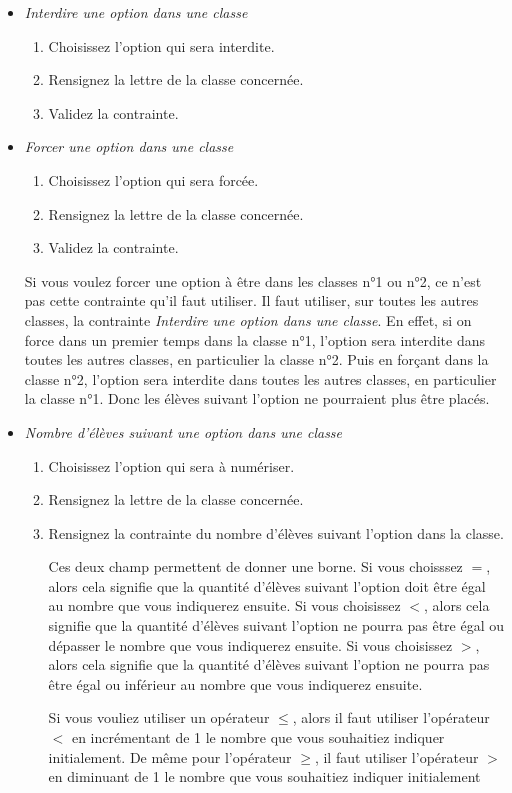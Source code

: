 \documentclass[11pt,a4paper]{article}
\begin{document}
\begin{enumerate}
\begin{itemize}
\begin{enumerate}
    \end{enumerate}
    \item \textit{Interdire une option dans une classe}
    \begin{enumerate}
      \item Choisissez l'option qui sera interdite.
      \item Rensignez la lettre de la classe concernée.
      \item Validez la contrainte.
    \end{enumerate}
    \item \textit{Forcer une option dans une classe}
    \begin{enumerate}
      \item Choisissez l'option qui sera forcée.
      \item Rensignez la lettre de la classe concernée.
      \item Validez la contrainte.
    \end{enumerate}
    \begin{astuce}Si vous voulez forcer une option à être dans les classes n°1 ou n°2, ce n'est pas cette contrainte qu'il faut utiliser. Il faut utiliser, sur toutes les autres classes, la contrainte \textit{Interdire une option dans une classe}. En effet, si on force dans un premier temps dans la classe n°1, l'option sera interdite dans toutes les autres classes, en particulier la classe n°2. Puis en forçant dans la classe n°2, l'option sera interdite dans toutes les autres classes, en particulier la classe n°1. Donc les élèves suivant l'option ne pourraient plus être placés.\end{astuce}
    \item \textit{Nombre d'élèves suivant une option dans une classe}
    \begin{enumerate}
      \item Choisissez l'option qui sera à numériser.
      \item Rensignez la lettre de la classe concernée.
      \item Rensignez la contrainte du nombre d'élèves suivant l'option dans la classe.
      \begin{note} Ces deux champ permettent de donner une borne. Si vous choisssez $=$, alors cela signifie que la quantité d'élèves suivant l'option doit être égal au nombre que vous indiquerez ensuite. Si vous choisissez $<$, alors cela signifie que la quantité d'élèves suivant l'option ne pourra pas être égal ou dépasser le nombre que vous indiquerez ensuite. Si vous choisissez $>$, alors cela signifie que la quantité d'élèves suivant l'option ne pourra pas être égal ou inférieur au nombre que vous indiquerez ensuite.\end{note}\begin{astuce} Si vous vouliez utiliser un opérateur $\le$, alors il faut utiliser l'opérateur $<$ en incrémentant de 1 le nombre que vous souhaitiez indiquer initialement. De même pour l'opérateur $\ge$, il faut utiliser l'opérateur $>$ en diminuant de 1 le nombre que vous souhaitiez indiquer initialement\end{astuce}

\end{enumerate}
\end{itemize}
\end{enumerate}
\end{document}
